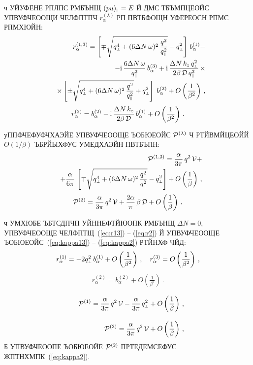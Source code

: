 \documentclass[koi8-r]{pazh2col}
\def\mprp{\mbox{\tiny $\bot$}}
\def\mprl{\mbox{\tiny $\|$}}
\def\beq{\begin{eqnarray}}
\def\eeq{\end{eqnarray}}
\def\beq{\begin{eqnarray}}
\def\eeq{\end{eqnarray}}
\newcommand{\ii}{\mathrm{i}}
\begin{document}
ч УЙУФЕНЕ РПЛПС РМБЪНЩ $(pu)_{\mprl} = E$ Й ДМС  
  ТБЪМПЦЕОЙС УПВУФЧЕООЩИ ЧЕЛФПТПЧ $r^{(\lambda)}_{\alpha}$ РП ПВТБФОЩН УФЕРЕОСН 
РПМС  РПМХЮЙН:  
%
\beq
\label{eq:r13}
&&r^{(1,3)}_{\alpha} = \left [\mp \sqrt{q^4_{\mprp} + 
(6 \Delta N \, \omega)^2\, \frac{q^2}{q_{\mprl}^2}}  - q^2_{\mprp} \right ]\, 
b^{(1)}_{\alpha} - 
\\
\nonumber
&&-
\ii \, \frac{6 \Delta N \, \omega}{q_{\mprl}^2} \,  b^{(3)}_{\alpha} +
 \ii \,\frac{\Delta N \, k_z \, q^2_{\mprp}}{2\beta \, {\cal D} \, q^2_{\mprl}}\, 
\times
\\
\nonumber 
&& \times
\left [\pm \sqrt{q^4_{\mprp} + 
(6 \Delta N \, \omega)^2\, \frac{q^2}{q_{\mprl}^2}} + q^2_{\mprp} \right ]\; b^{(2)}_{\alpha} + 
O \left (\frac{1}{\beta^2} \right) \, ,
\eeq
%
\beq
\label{eq:r2}
r^{(2)}_{\alpha} =  b^{(2)}_{\alpha} - 
\ii \, \frac{\Delta N  \, k_z }{2\beta \, {\cal D}} \, b^{(1)}_{\alpha} + 
O \left (\frac{1}{\beta^2} \right)  \, .
\eeq


уППФЧЕФУФЧХАЭЙЕ УПВУФЧЕООЩЕ ЪОБЮЕОЙС ${\cal P}^{(\lambda)}$ Ч РТЙВМЙЦЕОЙЙ 
$O(1/\beta)$  ЪБРЙЫХФУС УМЕДХАЭЙН ПВТБЪПН:
%
\beq
\label{eq:kappa13}
&&{\cal P}^{(1,3)} = \frac{\alpha}{3\pi} \, q^2 \, {\cal V} + 
\\
\nonumber
&&+
\frac{\alpha}{6\pi} \, \left [ 
 \mp \sqrt{q^4_{\mprp} + 
(6 \Delta N \, \omega)^2\, \frac{q^2}{q_{\mprl}^2}}  - q^2_{\mprp} \right ]  
+ O \left (\frac{1}{\beta} \right)  \, ,
\eeq
%
\beq
\label{eq:kappa2}
{\cal P}^{(2)} = \frac{\alpha}{3\pi} \, q^2 \, {\cal V} + \frac{2 \alpha}{\pi} \, \beta \, {\cal D}  + 
 O \left (\frac{1}{\beta} \right) \, .
\eeq

ч  УМХЮБЕ ЪБТСДПЧП УЙННЕФТЙЮОПК РМБЪНЩ $\Delta N = 0$, 
УПВУФЧЕООЩЕ ЧЕЛФПТЩ~(\ref{eq:r13}) -- (\ref{eq:r2}) Й 
УПВУФЧЕООЩЕ ЪОБЮЕОЙС~(\ref{eq:kappa13}) -- (\ref{eq:kappa2}) РТЙНХФ ЧЙД:
%
\beq
\label{eq:r130}
r^{(1)}_{\alpha} =  -2 q^2_{\mprp} \, b^{(1)}_{\alpha}  + O \left (\frac{1}{\beta^2} \right) \, ,
\quad   r^{(3)}_{\alpha} =  O \left (\frac{1}{\beta^2} \right) \, ,
\eeq
%
\beq
\label{eq:r20}
r^{(2)}_{\alpha} =  b^{(2)}_{\alpha}  + O \left (\frac{1}{\beta^2} \right)  \, .
\eeq


%
\beq
\label{eq:kappa10}
&&{\cal P}^{(1)} = \frac{\alpha}{3\pi} \, q^2 \, {\cal V} - \frac{\alpha}{3\pi} \, 
q^2_{\mprp} + O \left (\frac{1}{\beta} \right)  \, ,
\\[3mm]
\label{eq:kappa30}
&&{\cal P}^{(3)} = \frac{\alpha}{3\pi} \, q^2 \, {\cal V} + O \left (\frac{1}{\beta} \right)  \, ,
\eeq
%
\noindent Б УПВУФЧЕООПЕ ЪОБЮЕОЙЕ  ${\cal P}^{(2)}$ ПРТЕДЕМСЕФУС ЖПТНХМПК~(\ref{eq:kappa2}).
\end{document}
